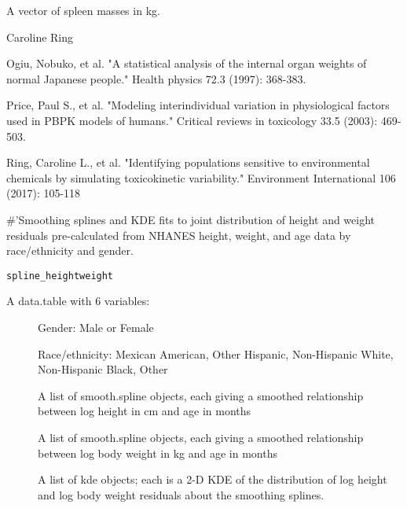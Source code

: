 \documentclass[a4paper]{book}
\begin{document}
%
\begin{Value}
A vector of spleen masses in kg.
\end{Value}
%
\begin{Author}\relax
Caroline Ring
\end{Author}
%
\begin{References}\relax
Ogiu, Nobuko, et al. "A statistical analysis of the internal 
organ weights of normal Japanese people." Health physics 72.3 (1997): 368-383.

Price, Paul S., et al. "Modeling interindividual variation in physiological 
factors used in PBPK models of humans." Critical reviews in toxicology 33.5 
(2003): 469-503.

Ring, Caroline L., et al. "Identifying populations sensitive to
environmental chemicals by simulating toxicokinetic variability."
Environment International 106 (2017): 105-118
\end{References}
%
\begin{Description}\relax
\#'Smoothing splines and KDE fits to joint distribution of height and weight
residuals pre-calculated from NHANES height, weight, and age data by
race/ethnicity and gender.
\end{Description}
%
\begin{Usage}
\begin{verbatim}
spline_heightweight
\end{verbatim}
\end{Usage}
%
\begin{Format}
A data.table with 6 variables: \begin{description}
 \item[] Gender: Male
or Female\item[] Race/ethnicity: Mexican American, Other Hispanic,
Non-Hispanic White, Non-Hispanic Black, Other\item[] A
list of smooth.spline objects, each giving a smoothed relationship between
log height in cm and age in months\item[] A list of
smooth.spline objects, each giving a smoothed relationship between log body
weight in kg and age in months\item[] A list of kde objects;
each is a 2-D KDE of the distribution of log height and log body weight
residuals about the smoothing splines.
\end{description}

\end{Format}
\end{document}
